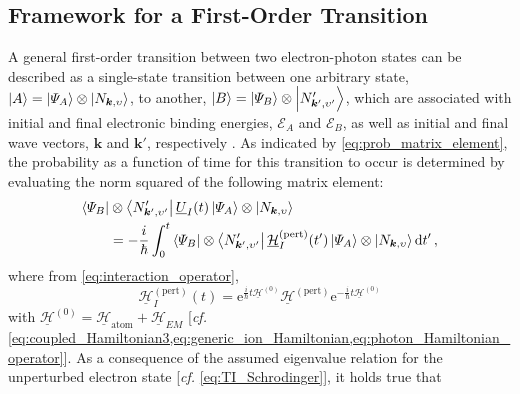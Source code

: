 \subsection{Framework for a First-Order Transition}\label{sec:gen_first_order}
A general first-order transition between two electron-photon states can be described as a single-state transition between one arbitrary state, $\ket{A} = \ket{\Psi_A} \otimes \ket{N_{\mathbold{k},\upsilon}}$, to another, $\ket{B} = \ket{\Psi_B} \otimes \ket{N_{\mathbold{k}',\upsilon'}'}$, which are associated with initial and final electronic binding energies, $\mathcal{E}_A$ and $\mathcal{E}_B$, as well as initial and final wave vectors, $\mathbold{k}$ and $\mathbold{k}'$, respectively \cite{Shankar04,kapitell4,wysin2011quantization}. 
As indicated by \cref{eq:prob_matrix_element}, the probability as a function of time for this transition to occur is determined by evaluating the norm squared of the following matrix element: 
\begin{align}\label{eq:general_evolution1}
 \begin{split}
 \bra{\Psi_B} &\otimes \bra{N_{\mathbold{k}',\upsilon'}'} \underline{U}_I (t) \ket{\Psi_A} \otimes \ket{N_{\mathbold{k},\upsilon}} \\
 &= - \frac{i}{\hbar} \int_0^t \bra{\Psi_B} \otimes \bra{N_{\mathbold{k}',\upsilon'}'} \underline{\mathcal{H}}^{(\text{pert})}_{I} (t') \ket{\Psi_A} \otimes \ket{N_{\mathbold{k},\upsilon}} \dd{t'} , 
 \end{split}
 \end{align}
where from \cref{eq:interaction_operator}, 
\begin{equation}\label{eq:H_pert_general}
 \underline{\mathcal{H}}^{(\text{pert})}_I (t) = \mathrm{e}^{\frac{i}{\hbar} t \underline{\mathcal{H}}^{(0)}} \underline{\mathcal{H}}^{(\text{pert})} \mathrm{e}^{-\frac{i}{\hbar} t \underline{\mathcal{H}}^{(0)}} 
 \end{equation}
with $\underline{\mathcal{H}}^{(0)} = \underline{\mathcal{H}}_{\text{atom}} + \underline{\mathcal{H}}_{EM}$ [\emph{cf.\@} \cref{eq:coupled_Hamiltonian3,eq:generic_ion_Hamiltonian,eq:photon_Hamiltonian_operator}]. 
As a consequence of the assumed eigenvalue relation for the unperturbed electron state [\emph{cf.\@} \cref{eq:TI_Schrodinger}], it holds true that 
